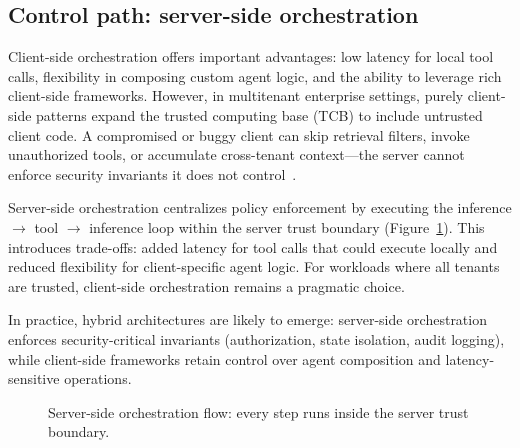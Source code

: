 \documentclass[sigconf]{acmart}
\begin{document}
\subsection{Control path: server-side orchestration}
\label{sec:control-path}

Client-side orchestration offers important advantages: low latency for local tool calls, flexibility in composing custom agent logic, and the ability to leverage rich client-side frameworks. However, in multitenant enterprise settings, purely client-side patterns expand the trusted computing base (TCB) to include untrusted client code. A compromised or buggy client can skip retrieval filters, invoke unauthorized tools, or accumulate cross-tenant context---the server cannot enforce security invariants it does not control~\cite{sculley2015hiddentechnicaldebt,amershi2019se4ml}.

Server-side orchestration centralizes policy enforcement by executing the inference $\rightarrow$ tool $\rightarrow$ inference loop within the server trust boundary (Figure~\ref{fig:orchestration-flow}). This introduces trade-offs: added latency for tool calls that could execute locally and reduced flexibility for client-specific agent logic. For workloads where all tenants are trusted, client-side orchestration remains a pragmatic choice.

In practice, hybrid architectures are likely to emerge: server-side orchestration enforces security-critical invariants (authorization, state isolation, audit logging), while client-side frameworks retain control over agent composition and latency-sensitive operations.

\begin{figure}[!htbp]
    \centering
    \caption{Server-side orchestration flow: every step runs inside the server trust boundary.}
    \label{fig:orchestration-flow}
  \end{figure}
\end{document}

